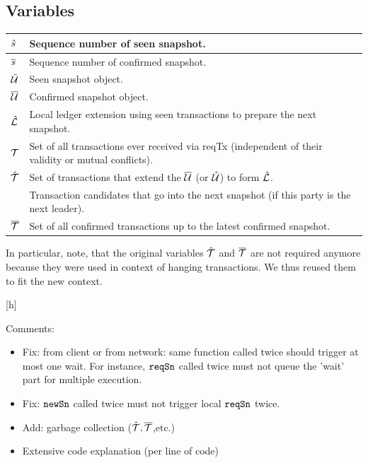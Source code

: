 \subsection{Variables}

\begin{center}
\begin{tabular}{|l|l|}\hline
  $\hat s$  & Sequence number of seen snapshot. \\ \hline
  $\overline s$  & Sequence number of confirmed snapshot. \\ \hline
  $\hat {\mathcal U}$ & Seen snapshot object. \\ \hline
  $\overline {\mathcal U}$ & Confirmed snapshot object. \\ \hline
  $\hat {\mathcal L}$ & Local ledger extension using seen transactions to prepare the next snapshot.\\ \hline
  ${\mathcal T}$    & Set of all transactions ever received via reqTx (independent of their validity or mutual conflicts).\\  \hline
  $\hat {\mathcal T}$ & Set of transactions that extend the $\overline {\mathcal U}$ (or $\hat {\mathcal U}$) to form $\hat {\mathcal L}$. \\
           & Transaction candidates that go into the next snapshot (if this party is the next leader).\\ \hline
  $\overline {\mathcal T}$ & Set of all confirmed transactions up to the latest confirmed snapshot.\\  \hline
\end{tabular}
\end{center}

In particular, note, that the original variables $\hat {\mathcal T}$ and $\overline {\mathcal T}$ are not required anymore because they
were used in context of hanging transactions. We thus reused them to fit the new context.

[h]

Comments: 
\begin{itemize}
\item Fix: from client or from network: same function called twice should trigger at most one wait.
  For instance, $\mathtt{reqSn}$ called twice must not queue the 'wait' part for multiple execution.
\item Fix: $\mathtt{newSn}$ called twice must not trigger local $\mathtt{reqSn}$ twice.
\item Add: garbage collection ($\hat {\mathcal T},\overline {\mathcal T}$,etc.)
\item Extensive code explanation (per line of code)
\end{itemize}

